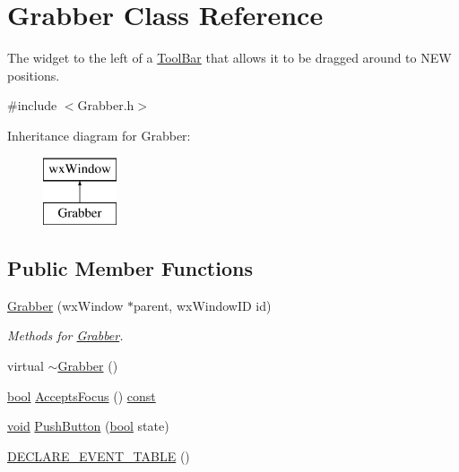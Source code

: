 \hypertarget{class_grabber}{}\section{Grabber Class Reference}
\label{class_grabber}


The widget to the left of a \hyperlink{class_tool_bar}{Tool\+Bar} that allows it to be dragged around to N\+EW positions.  




{\ttfamily \#include $<$Grabber.\+h$>$}

Inheritance diagram for Grabber\+:\begin{figure}[H]
\begin{center}
\leavevmode
\includegraphics[height=2.000000cm]{class_grabber}
\end{center}
\end{figure}
\subsection*{Public Member Functions}
\begin{DoxyCompactItemize}
\item 
\hyperlink{class_grabber_a99d469466ccbd6e9e00b6875c86e97b4}{Grabber} (wx\+Window $\ast$parent, wx\+Window\+ID id)
\begin{DoxyCompactList}\small\item\em Methods for \hyperlink{class_grabber}{Grabber}. \end{DoxyCompactList}\item 
virtual \hyperlink{class_grabber_a4c16c5473b88a4b4703ce37c493c15af}{$\sim$\+Grabber} ()
\item 
\hyperlink{mac_2config_2i386_2lib-src_2libsoxr_2soxr-config_8h_abb452686968e48b67397da5f97445f5b}{bool} \hyperlink{class_grabber_a08d58c14aea8a2c180847fbd171bd485}{Accepts\+Focus} () \hyperlink{getopt1_8c_a2c212835823e3c54a8ab6d95c652660e}{const} 
\item 
\hyperlink{sound_8c_ae35f5844602719cf66324f4de2a658b3}{void} \hyperlink{class_grabber_ae8c02b0706e0d57ddada30e1fe89e8d4}{Push\+Button} (\hyperlink{mac_2config_2i386_2lib-src_2libsoxr_2soxr-config_8h_abb452686968e48b67397da5f97445f5b}{bool} state)
\item 
\hyperlink{class_grabber_abd9fb61ea3a4eea784f3ed6eb3bbf046}{D\+E\+C\+L\+A\+R\+E\+\_\+\+E\+V\+E\+N\+T\+\_\+\+T\+A\+B\+LE} ()
\end{DoxyCompactItemize}
